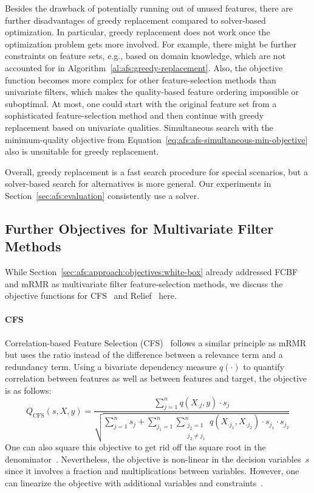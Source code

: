 \documentclass{article}
\theoremstyle{definition}
\begin{document}
Besides the drawback of potentially running out of unused features, there are further disadvantages of greedy replacement compared to solver-based optimization.
In particular, greedy replacement does not work once the optimization problem gets more involved.
For example, there might be further constraints on feature sets, e.g., based on domain knowledge, which are not accounted for in Algorithm~\ref{al:afs:greedy-replacement}.
Also, the objective function becomes more complex for other feature-selection methods than univariate filters, which makes the quality-based feature ordering impossible or suboptimal.
At most, one could start with the original feature set from a sophisticated feature-selection method and then continue with greedy replacement based on univariate qualities.
Simultaneous search with the minimum-quality objective from Equation~\ref{eq:afs:afs-simultaneous-min-objective} also is unsuitable for greedy replacement.

Overall, greedy replacement is a fast search procedure for special scenarios, but a solver-based search for alternatives is more general.
Our experiments in Section~\ref{sec:afs:evaluation} consistently use a solver.

\subsection{Further Objectives for Multivariate Filter Methods}
\label{sec:afs:appendix:multivariate-filter-objectives}

While Section~\ref{sec:afs:approach:objectives:white-box} already addressed FCBF and mRMR as multivariate filter feature-selection methods, we discuss the objective functions for CFS~\cite{hall1999correlation, hall2000correlation} and Relief~\cite{kira1992feature, robnik1997adaptation} here.

\paragraph{CFS}

Correlation-based Feature Selection (CFS)~\cite{hall1999correlation, hall2000correlation} follows a similar principle as mRMR but uses the ratio instead of the difference between a relevance term and a redundancy term.
Using a bivariate dependency measure $q(\cdot)$ to quantify correlation between features as well as between features and target, the objective is as follows:
%
\begin{equation}
	Q_{\text{CFS}}(s,X,y) = \frac{\sum_{j=1}^{n} q(X_{\cdot{}j},y) \cdot s_j}{\sqrt{\sum_{j=1}^{n} s_j + \sum_{j_1=1}^{n} \sum_{\substack{j_2=1 \\ j_2 \neq j_1}}^{n} q(X_{\cdot{}j_1}, X_{\cdot{}j_2}) \cdot s_{j_1} \cdot s_{j_2}}}
	\label{eq:afs:cfs}
\end{equation}
%
One can also square this objective to get rid off the square root in the denominator~\cite{nguyen2010towards}.
Nevertheless, the objective is non-linear in the decision variables~$s$ since it involves a fraction and multiplications between variables.
However, one can linearize the objective with additional variables and constraints~\cite{nguyen2010improving, nguyen2010towards}.
\end{document}
